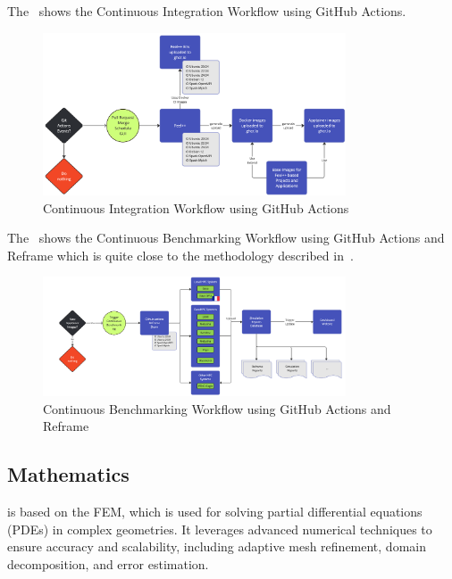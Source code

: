     The~ shows the \Feelpp Continuous Integration Workflow using GitHub Actions.
    \begin{figure}
        \centering
        \includegraphics[width=0.8\textwidth]{graphics/feelpp/feelpp-ci-workflow.png}
        \caption{\Feelpp Continuous Integration Workflow using GitHub Actions}
        \label{fig:feelpp-ci}
    \end{figure}

    The~ shows the \Feelpp Continuous Benchmarking Workflow using GitHub Actions and Reframe which is quite close to the methodology described in~.
    \begin{figure}
        \centering
        \includegraphics[width=0.8\textwidth]{graphics/feelpp/feelpp-cb-workflow.png}
        \caption{\Feelpp Continuous Benchmarking Workflow using GitHub Actions and Reframe}
        \label{fig:feelpp-cb}
    \end{figure}

\subsection{Mathematics}
\label{sec:Feelpp:mathematics}
\Feelpp is based on the \ac{FEM}, which is used for solving partial differential equations (PDEs) in complex geometries.
It leverages advanced numerical techniques to ensure accuracy and scalability, including adaptive mesh refinement, domain decomposition, and error estimation.

